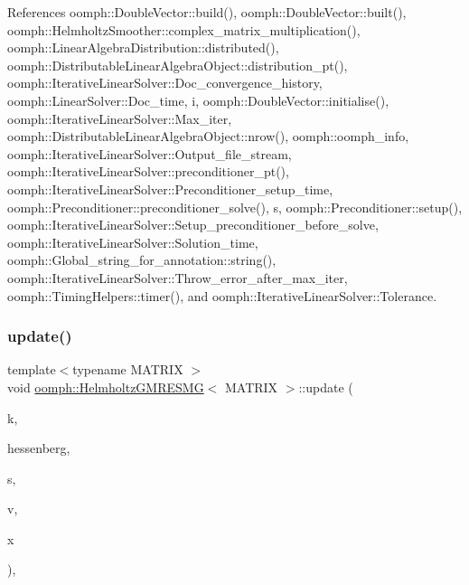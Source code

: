 References oomph\+::\+Double\+Vector\+::build(), oomph\+::\+Double\+Vector\+::built(), oomph\+::\+Helmholtz\+Smoother\+::complex\+\_\+matrix\+\_\+multiplication(), oomph\+::\+Linear\+Algebra\+Distribution\+::distributed(), oomph\+::\+Distributable\+Linear\+Algebra\+Object\+::distribution\+\_\+pt(), oomph\+::\+Iterative\+Linear\+Solver\+::\+Doc\+\_\+convergence\+\_\+history, oomph\+::\+Linear\+Solver\+::\+Doc\+\_\+time, i, oomph\+::\+Double\+Vector\+::initialise(), oomph\+::\+Iterative\+Linear\+Solver\+::\+Max\+\_\+iter, oomph\+::\+Distributable\+Linear\+Algebra\+Object\+::nrow(), oomph\+::oomph\+\_\+info, oomph\+::\+Iterative\+Linear\+Solver\+::\+Output\+\_\+file\+\_\+stream, oomph\+::\+Iterative\+Linear\+Solver\+::preconditioner\+\_\+pt(), oomph\+::\+Iterative\+Linear\+Solver\+::\+Preconditioner\+\_\+setup\+\_\+time, oomph\+::\+Preconditioner\+::preconditioner\+\_\+solve(), s, oomph\+::\+Preconditioner\+::setup(), oomph\+::\+Iterative\+Linear\+Solver\+::\+Setup\+\_\+preconditioner\+\_\+before\+\_\+solve, oomph\+::\+Iterative\+Linear\+Solver\+::\+Solution\+\_\+time, oomph\+::\+Global\+\_\+string\+\_\+for\+\_\+annotation\+::string(), oomph\+::\+Iterative\+Linear\+Solver\+::\+Throw\+\_\+error\+\_\+after\+\_\+max\+\_\+iter, oomph\+::\+Timing\+Helpers\+::timer(), and oomph\+::\+Iterative\+Linear\+Solver\+::\+Tolerance.

\mbox{\label{classoomph_1_1HelmholtzGMRESMG_ac08841fffc51bceb21122cd66988329b}} 
\subsubsection{\texorpdfstring{update()}{update()}}
{\footnotesize\ttfamily template$<$typename M\+A\+T\+R\+IX $>$ \\
void \hyperlink{classoomph_1_1HelmholtzGMRESMG}{oomph\+::\+Helmholtz\+G\+M\+R\+E\+S\+MG}$<$ M\+A\+T\+R\+IX $>$\+::update (\begin{DoxyParamCaption}\item[{const unsigned \&}]{k,  }\item[{const \hyperlink{classoomph_1_1Vector}{Vector}$<$ \hyperlink{classoomph_1_1Vector}{Vector}$<$ std\+::complex$<$ double $>$ $>$ $>$ \&}]{hessenberg,  }\item[{const \hyperlink{classoomph_1_1Vector}{Vector}$<$ std\+::complex$<$ double $>$ $>$ \&}]{s,  }\item[{const \hyperlink{classoomph_1_1Vector}{Vector}$<$ \hyperlink{classoomph_1_1Vector}{Vector}$<$ \hyperlink{classoomph_1_1DoubleVector}{Double\+Vector} $>$ $>$ \&}]{v,  }\item[{\hyperlink{classoomph_1_1Vector}{Vector}$<$ \hyperlink{classoomph_1_1DoubleVector}{Double\+Vector} $>$ \&}]{x }\end{DoxyParamCaption})\hspace{0.3cm}{\ttfamily [inline]}, {\ttfamily [protected]}}




